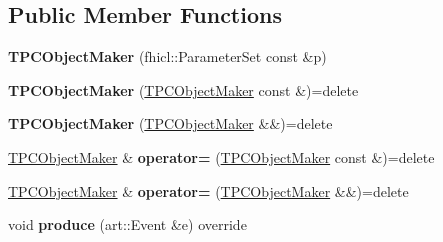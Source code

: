 \subsection*{Public Member Functions}
\begin{DoxyCompactItemize}
\item 
\hypertarget{group__UBXSec_ga2fa2477aabeb4c23aa6093ab805356dc}{{\bfseries T\-P\-C\-Object\-Maker} (fhicl\-::\-Parameter\-Set const \&p)}\label{group__UBXSec_ga2fa2477aabeb4c23aa6093ab805356dc}

\item 
\hypertarget{classubana_1_1TPCObjectMaker_a4b31917ac5f8837607be0ee7a6f11228}{{\bfseries T\-P\-C\-Object\-Maker} (\hyperlink{classubana_1_1TPCObjectMaker}{T\-P\-C\-Object\-Maker} const \&)=delete}\label{classubana_1_1TPCObjectMaker_a4b31917ac5f8837607be0ee7a6f11228}

\item 
\hypertarget{classubana_1_1TPCObjectMaker_ad7657af20d88fabb8df0731ee266d844}{{\bfseries T\-P\-C\-Object\-Maker} (\hyperlink{classubana_1_1TPCObjectMaker}{T\-P\-C\-Object\-Maker} \&\&)=delete}\label{classubana_1_1TPCObjectMaker_ad7657af20d88fabb8df0731ee266d844}

\item 
\hypertarget{classubana_1_1TPCObjectMaker_a033d89d1b56c526c5583b9c13c61b7bb}{\hyperlink{classubana_1_1TPCObjectMaker}{T\-P\-C\-Object\-Maker} \& {\bfseries operator=} (\hyperlink{classubana_1_1TPCObjectMaker}{T\-P\-C\-Object\-Maker} const \&)=delete}\label{classubana_1_1TPCObjectMaker_a033d89d1b56c526c5583b9c13c61b7bb}

\item 
\hypertarget{classubana_1_1TPCObjectMaker_a5d3a8bd521e699c7b381e8336a927ffd}{\hyperlink{classubana_1_1TPCObjectMaker}{T\-P\-C\-Object\-Maker} \& {\bfseries operator=} (\hyperlink{classubana_1_1TPCObjectMaker}{T\-P\-C\-Object\-Maker} \&\&)=delete}\label{classubana_1_1TPCObjectMaker_a5d3a8bd521e699c7b381e8336a927ffd}

\item 
\hypertarget{group__UBXSec_ga89833cfc129f7410afb7622a8dbf45b3}{void {\bfseries produce} (art\-::\-Event \&e) override}\label{group__UBXSec_ga89833cfc129f7410afb7622a8dbf45b3}


\end{DoxyCompactItemize}
